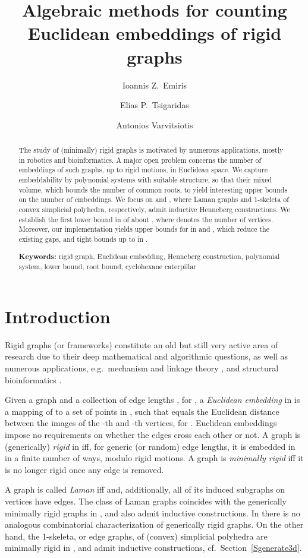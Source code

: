 \documentclass[envcountsame]{llncs}
\title{Algebraic methods for counting Euclidean embeddings of rigid graphs}
\author{Ioannis Z.\ Emiris \inst{1} \and  Elias P.\ Tsigaridas\inst{2} \and
  Antonios Varvitsiotis\inst{1} }
\institute{
  National and Kapodistrian University of Athens, Greece. \and INRIA     M\'editerran\'ee, Sophia-Antipolis, France.}
\begin{document}
\maketitle

\begin{abstract}
  The study of (minimally) rigid graphs is motivated by numerous applications,
  mostly in robotics and bioinformatics. 
  A major open problem concerns the number of embeddings of such graphs,
  up to rigid motions, in Euclidean space. We capture embeddability by polynomial systems
  with suitable structure, so that their mixed volume, which bounds the number 
  of common roots, to yield interesting upper bounds on the number of embeddings.
  We focus on  and , where Laman graphs and 1-skeleta of convex
simplicial polyhedra, respectively, admit inductive Henneberg
constructions. We establish the first  lower bound in  of about
, where  denotes the number of vertices. Moreover, our implementation
yields upper bounds for  in  and , which reduce the existing gaps, and tight bounds  up to   in .



\medskip

{\bf Keywords:}
{rigid graph, Euclidean embedding, Henneberg construction,
polynomial system, lower bound, root bound, cyclohexane caterpillar}
\end{abstract} 


\section{Introduction}

Rigid graphs (or frameworks)
constitute an old but still very active area of research due to their deep
mathematical and algorithmic questions, as well as numerous
applications, e.g.\ mechanism and linkage theory \cite{WH07,WH07b},
and structural bioinformatics \cite{EM99,JRKT01,TD99}. 

Given a graph  and a collection of edge lengths
, for , a {\em Euclidean embedding} in 
is a mapping of  to a set of points in , such that  equals
the Euclidean distance between the images of the -th and -th vertices,
for .
Euclidean embeddings impose no requirements on whether the edges cross each other or not.
A graph is (generically) {\em rigid} in  iff, for generic (or random)
edge lengths, it is embedded in  in a finite number of ways, modulo rigid motions.
A graph is {\em minimally rigid} iff it is no longer rigid once any edge is removed.

A graph is called {\em Laman} iff  and, additionally, 
all of its induced subgraphs on  vertices have  edges.
The class of Laman graphs coincides with  the generically minimally rigid graphs in ,
and also admit inductive constructions.
In  there is no analogous combinatorial characterization
of generically rigid graphs. On the other hand, the 1-skeleta, or edge graphs,
of (convex) simplicial polyhedra are minimally rigid in ,
and admit inductive constructions, cf.\ Section\ \ref{Sgenerate3d}.
\end{document}
